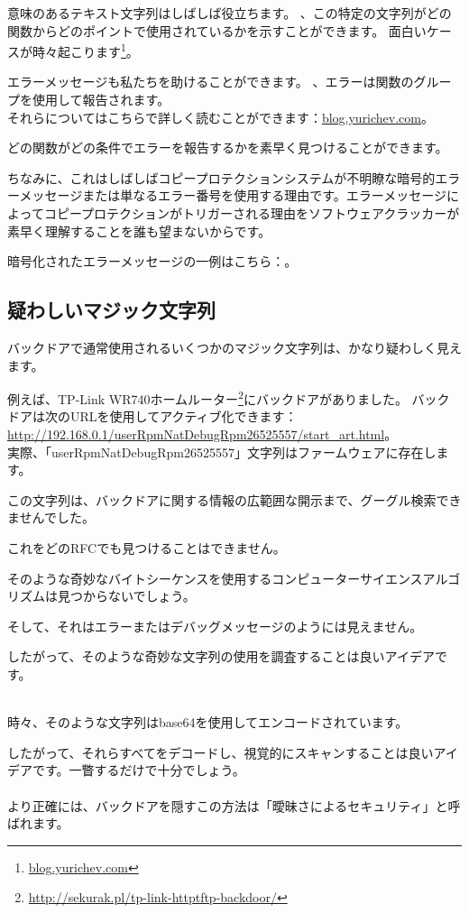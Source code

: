 意味のあるテキスト文字列はしばしば役立ちます。
、この特定の文字列がどの関数からどのポイントで使用されているかを示すことができます。
面白いケースが時々起こります\footnote{\href{http://go.yurichev.com/17223}{blog.yurichev.com}}。

エラーメッセージも私たちを助けることができます。
、エラーは関数のグループを使用して報告されます。\\
それらについてはこちらで詳しく読むことができます：\href{http://go.yurichev.com/17224}{blog.yurichev.com}。


どの関数がどの条件でエラーを報告するかを素早く見つけることができます。

ちなみに、これはしばしばコピープロテクションシステムが不明瞭な暗号的エラーメッセージまたは単なるエラー番号を使用する理由です。エラーメッセージによってコピープロテクションがトリガーされる理由をソフトウェアクラッカーが素早く理解することを誰も望まないからです。

暗号化されたエラーメッセージの一例はこちら：。

\subsection{疑わしいマジック文字列}

バックドアで通常使用されるいくつかのマジック文字列は、かなり疑わしく見えます。

例えば、TP-Link WR740ホームルーター\footnote{\url{http://sekurak.pl/tp-link-httptftp-backdoor/}}にバックドアがありました。
バックドアは次のURLを使用してアクティブ化できます：\\
\url{http://192.168.0.1/userRpmNatDebugRpm26525557/start_art.html}。\\

実際、「userRpmNatDebugRpm26525557」文字列はファームウェアに存在します。

この文字列は、バックドアに関する情報の広範囲な開示まで、グーグル検索できませんでした。

これをどの\ac{RFC}でも見つけることはできません。

そのような奇妙なバイトシーケンスを使用するコンピューターサイエンスアルゴリズムは見つからないでしょう。

そして、それはエラーまたはデバッグメッセージのようには見えません。

したがって、そのような奇妙な文字列の使用を調査することは良いアイデアです。\\
\\

時々、そのような文字列はbase64を使用してエンコードされています。

したがって、それらすべてをデコードし、視覚的にスキャンすることは良いアイデアです。一瞥するだけで十分でしょう。\\
\\
より正確には、バックドアを隠すこの方法は「曖昧さによるセキュリティ」と呼ばれます。